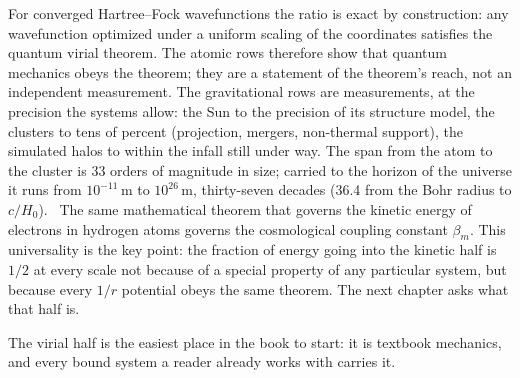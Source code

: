 For converged Hartree--Fock wavefunctions the ratio is exact by construction: any wavefunction optimized under a uniform scaling of the coordinates satisfies
the quantum virial theorem. The atomic rows therefore show that quantum mechanics obeys the theorem; they are a statement of the theorem's reach, not an
independent measurement. The gravitational rows are measurements, at the precision the systems allow: the Sun to the precision of its structure model, the
clusters to tens of percent (projection, mergers, non-thermal support), the simulated halos to within the infall still under way. The span from the atom to the cluster is 33
orders of magnitude in size; carried to the horizon of the universe it runs from $10^{-11}$\,m to $10^{26}$\,m, thirty-seven decades (36.4 from the Bohr
radius to $c/H_0$). \calc\ The same mathematical theorem that governs the kinetic energy of electrons in hydrogen atoms governs the cosmological coupling
constant $\beta_m$. This universality is the key point: the fraction of energy going into the kinetic half is $1/2$ at every scale not because of a special
property of any particular system, but because every $1/r$ potential obeys the same theorem. The next chapter asks what that half is.

The virial half is the easiest place in the book to start: it is textbook mechanics, and every bound system a reader already works with carries it.
